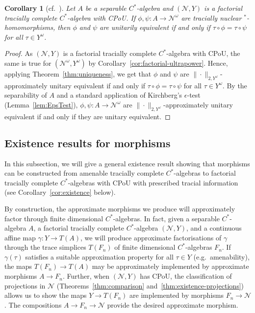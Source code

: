 \documentclass[a4paper,11pt]{amsart}
\newtheorem{corollary}[theorem]{Corollary}
\theoremstyle{definition}
\numberwithin{equation}{section}
\numberwithin{theorem}{section}
\begin{document}
\begin{corollary}[{cf.\ \cite[Theorem 2.2]{CETW-classification}}]
	\label{cor:uniqueness}
	Let $A$ be a separable $C^*$-algebra and $(\mathcal N, Y)$ is a factorial tracially complete $C^*$-algebra with CPoU.  If $\phi, \psi \colon A \rightarrow \mathcal N^\omega$ are tracially nuclear $^*$-homomorphisms, then $\phi$ and $\psi$ are unitarily equivalent if and only if $\tau \circ \phi = \tau \circ \psi$ for all $\tau \in Y^\omega$.
\end{corollary}
\begin{proof}
	As $(\mathcal N, Y)$ is a factorial tracially complete $C^*$-algebra with CPoU, the same is true for $(\mathcal{N}^\omega, Y^\omega)$ by Corollary~\ref{cor:factorial-ultrapower}. Hence, applying Theorem~\ref{thm:uniqueness}, we get that $\phi$ and $\psi$ are $\|\cdot\|_{2,Y^\omega}$-approximately unitary equivalent if and only if $\tau \circ \phi = \tau \circ \psi$ for all $\tau \in Y^\omega$. By the separability of $A$ and a standard application of Kirchberg's $\epsilon$-test (Lemma~\ref{lem:EpsTest}), $\phi, \psi \colon A \rightarrow \mathcal N^\omega$ are $\|\cdot\|_{2,Y^\omega}$-approximately unitary equivalent if and only if they are unitary equivalent. 
\end{proof}

\subsection{Existence results for morphisms}\label{sec:existence}

In this subsection, we will give a general existence result showing that morphisms can be constructed from {}amenable tracially complete $C^*$-algebras to factorial tracially complete $C^*$-algebras with CPoU with prescribed tracial information (see Corollary~\ref{cor:existence} below).

By construction, the approximate morphisms we produce will approximately factor through finite dimensional $C^*$-algebras.  In fact, given a separable $C^*$-algebra $A$, a factorial tracially complete $C^*$-algebra $(\mathcal N, Y)$, and a continuous affine map $\gamma \colon Y \rightarrow T(A)$, we will produce approximate factorisations of $\gamma$ through the trace simplices $T(F_n)$ of finite dimensional $C^*$-algebras $F_n$.  If $\gamma(\tau)$ satisfies a suitable approximation property for all $\tau \in Y$ (e.g.\ amenability), the maps $T(F_n) \rightarrow T(A)$ may be approximately implemented by approximate morphisms $A \rightarrow F_n$.  Further, when $(\mathcal N, Y)$ has CPoU, the classification of projections in $\mathcal N$ (Theorems~\ref{thm:comparison} and~\ref{thm:existence-projections}) allows us to show the maps $Y \rightarrow T(F_n)$ are implemented by morphisms $F_n \rightarrow \mathcal N$.  The compositions $A \rightarrow F_n \rightarrow \mathcal N$ provide the desired approximate morphism.
\end{document}
